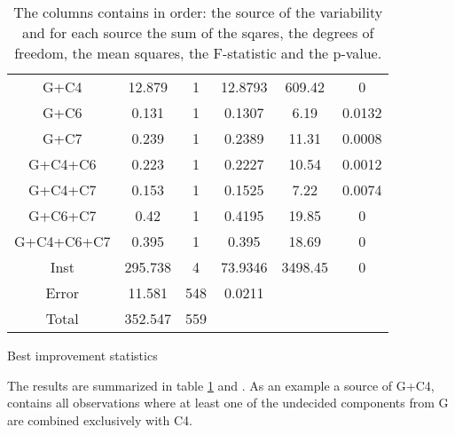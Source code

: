 \documentclass[../main.tex]{subfiles}
\begin{document}
\begin{table}
\begin{adjustbox}{width=\columnwidth,center}
\begin{subtable}{.85\columnwidth}
\begin{tabular}{cccccc}
            \hline
            G+C4        & 12.879    & 1 & 12.8793   & 609.42& 0     \\
            G+C6        & 0.131     & 1 & 0.1307    & 6.19  & 0.0132\\
            G+C7        & 0.239     & 1 & 0.2389    & 11.31 & 0.0008\\
            G+C4+C6     & 0.223     & 1 & 0.2227    & 10.54 & 0.0012\\
            G+C4+C7     & 0.153     & 1 & 0.1525    & 7.22  & 0.0074\\
            G+C6+C7     & 0.42      & 1 & 0.4195    & 19.85 & 0     \\
            G+C4+C6+C7  & 0.395     & 1 & 0.395     & 18.69 & 0     \\
            Inst        & 295.738   & 4 & 73.9346   &3498.45& 0     \\
            Error       & 11.581    &548& 0.0211    &       &       \\
            Total       & 352.547   &559&           &       &       \\
            \hline
            \end{tabular}
        \caption{Best improvement statistics}
            \label{tab:anovaBestGroup}
        \end{subtable}
    \end{adjustbox}
    \label{tab:anovaGroup}
    \caption*{The columns contains in order: the source of the variability and for each source the sum of the sqares, the degrees of freedom, the mean squares, the F-statistic and the p-value.}
\end{table}

The results are summarized in table \ref{tab:anovaGroup} and . 
As an example a source of G+C4, contains all observations where at least one of the undecided components from G are combined exclusively with C4.
\end{document}
